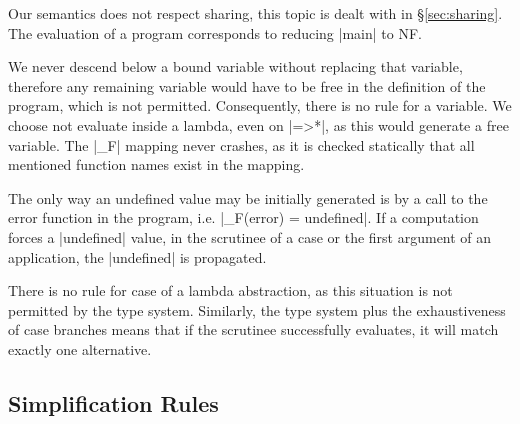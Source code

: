 Our semantics does not respect sharing, this topic is dealt with in \S\ref{sec:sharing}. The evaluation of a program corresponds to reducing |main| to NF.

We never descend below a bound variable without replacing that variable, therefore any remaining variable would have to be free in the definition of the program, which is not permitted. Consequently, there is no rule for a variable. We choose not evaluate inside a lambda, even on |=>*|, as this would generate a free variable. The |_F| mapping never crashes, as it is checked statically that all mentioned function names exist in the mapping.

The only way an undefined value may be initially generated is by a call to the error function in the program, i.e. |_F(error) = undefined|. If a computation forces a |undefined| value, in the scrutinee of a case or the first argument of an application, the |undefined| is propagated.

There is no rule for case of a lambda abstraction, as this situation is not permitted by the type system. Similarly, the type system plus the exhaustiveness of case branches means that if the scrutinee successfully evaluates, it will match exactly one alternative.

\subsection{Simplification Rules}

